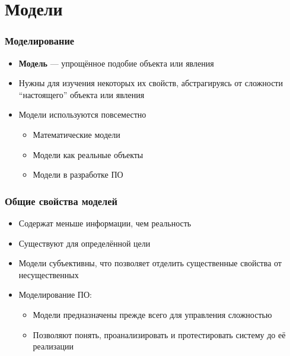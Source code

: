 \documentclass{../../slides-style}
\begin{document}
    \begin{frame}[plain]
        \titlepage
    \end{frame}

    \section{Модели}

    \begin{frame}
        \frametitle{Моделирование}
        \begin{itemize}
            \item \textbf{Модель} --- упрощённое подобие объекта или явления
            \item Нужны для изучения некоторых их свойств, абстрагируясь от сложности ``настоящего'' объекта или явления
            \item Модели используются повсеместно
            \begin{itemize}
                \item Математические модели
                \item Модели как реальные объекты
                \item Модели в разработке ПО
            \end{itemize}
        \end{itemize}
    \end{frame}

    \begin{frame}
        \frametitle{Общие свойства моделей}
        \begin{itemize}
            \item Содержат меньше информации, чем реальность
            \item Существуют для определённой цели
            \item Модели субъективны, что позволяет отделить существенные свойства от несущественных
            \item Моделирование ПО:
            \begin{itemize}
                \item Модели предназначены прежде всего для управления сложностью
                \item Позволяют понять, проанализировать и протестировать систему до её реализации
            \end{itemize}
        \end{itemize}

    \end{frame}
\end{document}
